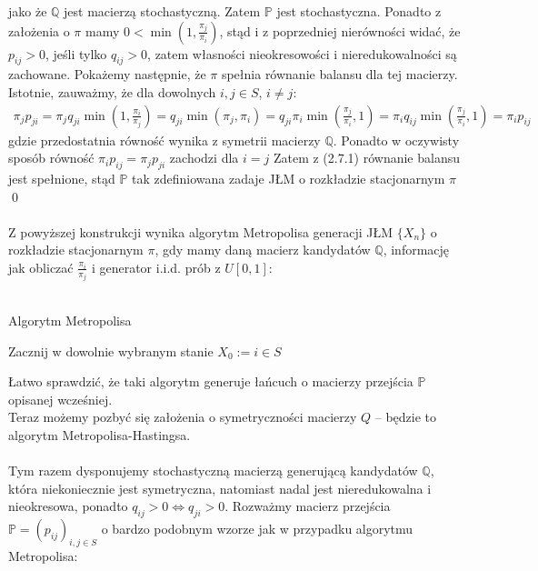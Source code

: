 \documentclass[a4paper]{article}
\begin{document}
jako że $\mathbb{Q}$ jest macierzą stochastyczną. Zatem $\mathbb{P}$ jest stochastyczna. Ponadto z założenia o $\pi$ mamy $0 < \min(1, \frac{\pi_j}{\pi_i})$, stąd i z poprzedniej nierówności widać, że $p_{ij} > 0$, jeśli tylko $q_{ij} > 0$, zatem własności nieokresowości i nieredukowalności są zachowane.  Pokażemy następnie, że $\pi$ spełnia równanie balansu dla tej macierzy. Istotnie, zauważmy, że dla dowolnych $i,j \in S$, $i \neq j$:
\begin{align*}
    \pi_j p_{ji} = \pi_j q_{ji} \min(1, \frac{\pi_i}{\pi_j}) =  q_{ji} \min(\pi_j, \pi_i) = q_{ji} \pi_i \min(\frac{\pi_j}{\pi_i}, 1) =  \pi_i q_{ij} \min(\frac{\pi_j}{\pi_i}, 1) = \pi_i p_{ij}
\end{align*}
gdzie przedostatnia równość wynika z symetrii macierzy $\mathbb{Q}$. Ponadto w oczywisty sposób równość $\pi_i p_{ij} = \pi_j p_{ji}$ zachodzi dla $i = j$ Zatem z (2.7.1) równanie balansu jest spełnione, stąd $\mathbb{P}$ tak zdefiniowana zadaje JŁM o rozkładzie stacjonarnym $\pi$ \qed
\\
\\
Z powyższej konstrukcji wynika algorytm Metropolisa generacji JŁM $\{X_n\}$ o rozkładzie stacjonarnym $\pi$, gdy mamy daną macierz kandydatów $\mathbb{Q}$, informację jak obliczać $\frac{\pi_i}{\pi_j}$ i generator  i.i.d. prób z $U[0,1]$:\\\\
\begin{algorithm}[H]
\caption{Algorytm Metropolisa}
Zacznij w dowolnie wybranym stanie $X_0 := i \in S$\\
\end{algorithm}
Łatwo sprawdzić, że taki algorytm generuje łańcuch o macierzy przejścia $\mathbb{P}$ opisanej wcześniej.\\
Teraz możemy pozbyć się założenia o symetryczności macierzy $Q$ – będzie to algorytm Metropolisa-Hastingsa.\\
\\
Tym razem dysponujemy stochastyczną macierzą generującą kandydatów $\mathbb{Q}$, która niekoniecznie jest symetryczna, natomiast nadal jest nieredukowalna i nieokresowa, ponadto $q_{ij} > 0 \iff q_{ji} > 0$. Rozważmy macierz przejścia $\mathbb{P} = (p_{ij})_{i,j \in S}$ o bardzo podobnym wzorze jak w przypadku algorytmu Metropolisa:
\end{document}
